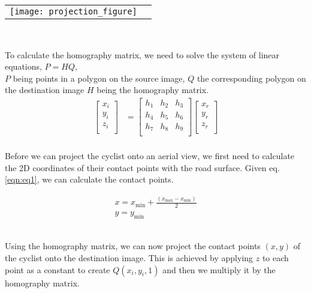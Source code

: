 \noindent
\begin{tabular}{@{}cc}
\texttt{[image: projection\_figure]} 
\end{tabular}
\label{projection_figure}
\

To calculate the homography matrix, we need to solve the system of linear equations, $P = HQ$,
\ \\
$P$ being points in a polygon on the source image, $Q$ the corresponding polygon on the destination image $H$ being the homography matrix.
\begin{align}
\label{eq:3}
  \begin{bmatrix}
    x_{i} \\
    y_{i} \\
    z_{i} \\
  \end{bmatrix}
  &= \begin{bmatrix}
      h_1 & h_2 & h_3 \\
      h_4 & h_5 & h_6 \\
      h_7 & h_8 & h_9 \\
  \end{bmatrix}
  \begin{bmatrix}
    x_{r} \\
    y_{r} \\
    z_{r} \\
  \end{bmatrix}
\end{align}
\ \\

Before we can project the cyclist onto an aerial view, we first need to calculate the 2D coordinates of their contact points with the road surface.
Given eq. \ref{eqn:eq1}, we can calculate the contact points.

\begin{equation}
\label{eqn:eq1}
\begin{array}{l}
x = x_\mathrm{min} + \frac{(x_\mathrm{max} - x_\mathrm{min})}{2} \\
y = y_\mathrm{min}
\end{array}
\end{equation}
\

Using the homography matrix, we can now project the contact points $(x, y)$ of the cyclist onto the destination
image. This is achieved by applying $z$ to each point as a constant to create $Q(x_i, y_i, 1)$ and then we multiply it by the homography matrix. 


